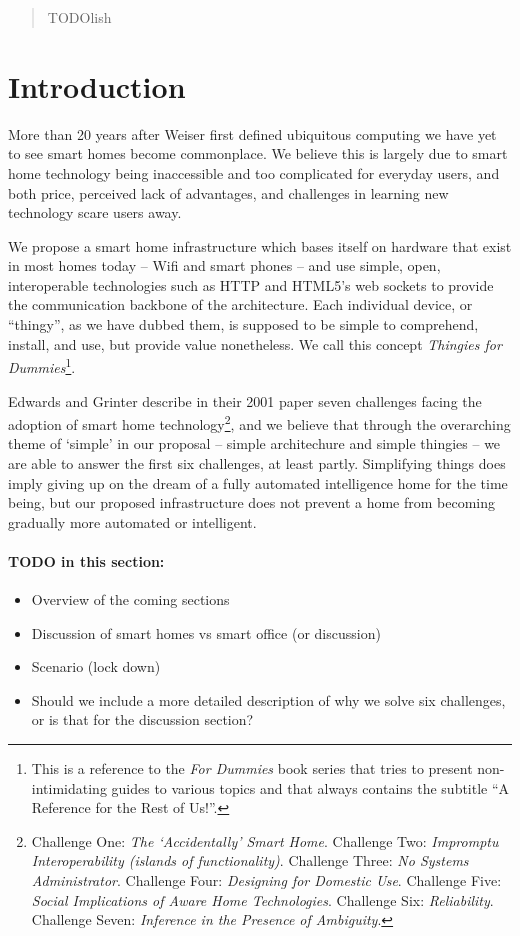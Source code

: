 \documentclass{article}
\begin{document}
\begin{abstract}
  TODOlish
\end{abstract}

\section{Introduction}

More than 20 years after Weiser first defined ubiquitous computing \cite{Weiser1991} we have yet to see smart homes become commonplace. We believe this is largely due to smart home technology being inaccessible and too complicated for everyday users, and both price, perceived lack of advantages, and challenges in learning new technology scare users away.

We propose a smart home infrastructure which bases itself on hardware that exist in most homes today -- Wifi and smart phones -- and use simple, open, interoperable technologies such as HTTP and HTML5's web sockets to provide the communication backbone of the architecture. Each individual device, or ``thingy'', as we have dubbed them, is supposed to be simple to comprehend, install, and use, but provide value nonetheless. We call this concept \textit{Thingies for Dummies}\footnote{This is a reference to the \textit{For Dummies} book series that tries to present non-intimidating guides to various topics and that always contains the subtitle ``A Reference for the Rest of Us!''.}.

Edwards and Grinter describe in their 2001 paper \cite{Edwards01athome} seven challenges facing the adoption of smart home technology\footnote{Challenge One: \textit{The `Accidentally' Smart Home}. Challenge Two: \textit{Impromptu Interoperability (islands of functionality)}. Challenge Three: \textit{No Systems Administrator}. Challenge Four: \textit{Designing for Domestic Use}. Challenge Five: \textit{Social Implications of Aware Home Technologies}. Challenge Six: \textit{Reliability}. Challenge Seven: \textit{Inference in the Presence of Ambiguity}.}, and we believe that through the overarching theme of `simple’ in our proposal -- simple architechure and simple thingies -- we are able to answer the first six challenges, at least partly. Simplifying things does imply giving up on the dream of a fully automated intelligence home for the time being, but our proposed infrastructure does not prevent a home from becoming gradually more automated or intelligent.

\paragraph{TODO in this section:}
\begin{itemize}
\item Overview of the coming sections
\item Discussion of smart homes vs smart office (or discussion)
\item Scenario (lock down)
\item Should we include a more detailed description of why we solve six challenges, or is that for the discussion section?
\end{itemize}
\end{document}
